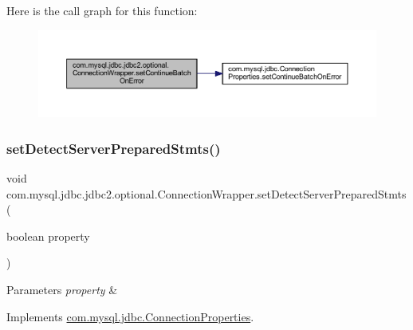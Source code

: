 Here is the call graph for this function\+:
\nopagebreak
\begin{figure}[H]
\begin{center}
\leavevmode
\includegraphics[width=350pt]{classcom_1_1mysql_1_1jdbc_1_1jdbc2_1_1optional_1_1_connection_wrapper_a0d0494da50a007f3aea31ada724385d9_cgraph}
\end{center}
\end{figure}
\mbox{\label{classcom_1_1mysql_1_1jdbc_1_1jdbc2_1_1optional_1_1_connection_wrapper_a0c80fd9ac23df453f078c771d7b88760}} 
\subsubsection{\texorpdfstring{set\+Detect\+Server\+Prepared\+Stmts()}{setDetectServerPreparedStmts()}}
{\footnotesize\ttfamily void com.\+mysql.\+jdbc.\+jdbc2.\+optional.\+Connection\+Wrapper.\+set\+Detect\+Server\+Prepared\+Stmts (\begin{DoxyParamCaption}\item[{boolean}]{property }\end{DoxyParamCaption})}


\begin{DoxyParams}{Parameters}
{\em property} & \\
\hline
\end{DoxyParams}


Implements \mbox{\hyperlink{interfacecom_1_1mysql_1_1jdbc_1_1_connection_properties_aadfec3198248406f73aea1a634fc3839}{com.\+mysql.\+jdbc.\+Connection\+Properties}}.

